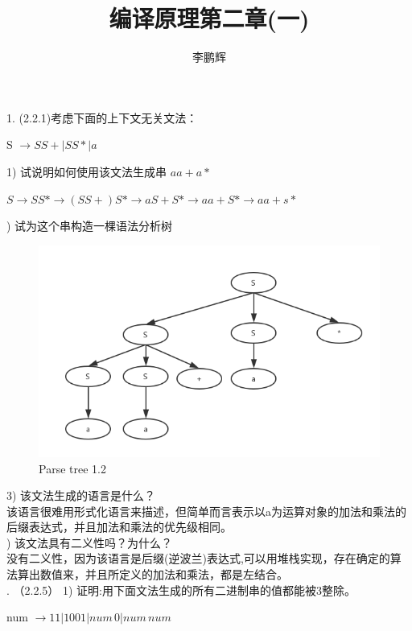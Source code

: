 \documentclass[a4paper， 16pt]{article}
\title{编译原理第二章(一)}
\author{李鹏辉}
\begin{document}
\maketitle
\begin{flushleft}
1. (2.2.1)考虑下面的上下文无关文法：\\
\centerline{S $\rightarrow SS+ | SS* | a$}
1) 试说明如何使用该文法生成串 $aa+a*$\\
\centerline{$S \rightarrow SS* \rightarrow (SS+)S* \rightarrow aS+S* \rightarrow aa+S* \rightarrow aa+s*$}
) 试为这个串构造一棵语法分析树\\
\begin{figure}[H]
\centering
\includegraphics[scale = 0.6]{chapter2_hw1_1}
\caption{Parse tree 1.2}
\label{f1}
\end{figure}
3) 该文法生成的语言是什么？\\
该语言很难用形式化语言来描述，但简单而言表示以a为运算对象的加法和乘法的后缀表达式，并且加法和乘法的优先级相同。\\
) 该文法具有二义性吗？为什么？\\
没有二义性，因为该语言是后缀(逆波兰)表达式,可以用堆栈实现，存在确定的算法算出数值来，并且所定义的加法和乘法，都是左结合。\\
. （2.2.5） 
1) 证明:用下面文法生成的所有二进制串的值都能被3整除。
\centerline{num $\rightarrow 11 | 1001 | num\,0 | num \, num$}


\end{flushleft}
\end{document}
